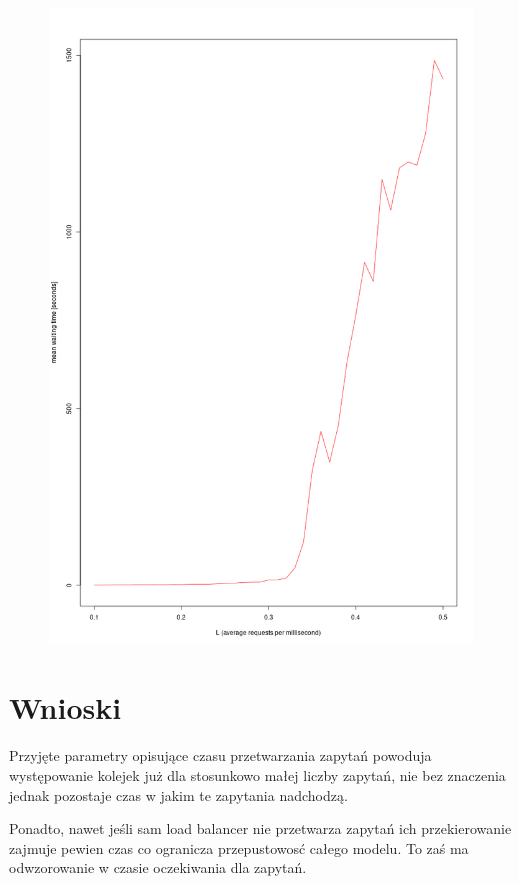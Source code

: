 \documentclass[12pt,oneside,a4paper]{book} %
\theoremstyle{break}
\begin{document}
\begin{figure}[H]
  \centering
  \includegraphics*[width=\textwidth]{image.png}
\end{figure}

\section*{Wnioski}

Przyjęte parametry opisujące czasu przetwarzania zapytań powoduja występowanie kolejek już dla stosunkowo małej liczby zapytań, nie bez znaczenia jednak pozostaje czas w jakim te zapytania nadchodzą.

Ponadto, nawet jeśli sam load balancer nie przetwarza zapytań ich przekierowanie zajmuje pewien czas co ogranicza przepustowosć całego modelu. To zaś ma odwzorowanie w czasie oczekiwania dla zapytań.
\end{document}
